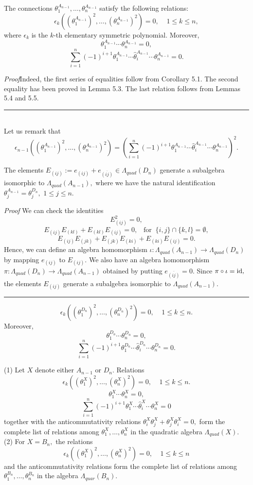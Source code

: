 \begin{thm}
The connections $\theta_1^{A_{n-1}},\ldots,
\theta_n^{A_{n-1}}$ satisfy 
the following relations: 
\[ \epsilon_k((\theta_1^{A_{n-1}})^2,\ldots,(\theta_n^{A_{n-1}})^2)=0, 
\; \; \; \; 1\leq k \leq n, \] 
where $\epsilon_k$ is the $k$-th elementary symmetric polynomial. 
Moreover, 
\[ \theta_1^{A_{n-1}}\cdots \theta_n^{A_{n-1}}=0, \]
\[ \sum_{i=1}^n (-1)^{i+1}\theta_1^{A_{n-1}}\cdots 
\hat{\theta}_i^{A_{n-1}}\cdots \theta_n^{A_{n-1}} =0. \]
\end{thm}
{\it Proof}\quad Indeed, the first series of equalities 
follow from Corollary 5.1. The second equality has been proved in 
Lemma 5.3. 
The last relation follows from 
Lemmas 5.4 and 5.5. 
\quad \rule{3mm}{3mm} 
\medskip \\ 
Let us remark that 
\[ \epsilon_{n-1}((\theta_1^{A_{n-1}})^2,\ldots,(\theta_n^{A_{n-1}})^2)
= \left( \sum_{i=1}^n (-1)^{i+1}\theta_1^{A_{n-1}}\cdots 
\hat{\theta}_i^{A_{n-1}}\cdots \theta_n^{A_{n-1}} \right) ^2. \] 
\begin{prop}
The elements $E_{(ij)}:=e_{(ij)}+e_{\overline{(ij)}}\in 
\Lambda_{quad}(D_n)$ generate a subalgebra isomorphic to 
$\Lambda_{quad}(A_{n-1}),$ where we have the natural 
identification $\theta_j^{A_{n-1}}
=\theta_j^{D_n},$ $1\leq j \leq n.$ 
\end{prop}
{\it Proof} \quad We can check the identities 
\[ E_{(ij)}^2=0, \] 
\[ E_{(ij)}E_{(kl)}+E_{(kl)}E_{(ij)}=0, \; \; \; 
\textrm{for} \; \; \{ i,j \} \cap \{ k,l \} = \emptyset , \] 
\[ E_{(ij)}E_{(jk)}+E_{(jk)}E_{(ki)} + E_{(ki)}E_{(ij)}=0. \] 
Hence, we can define an algebra homomorphism 
$\iota : \Lambda_{quad}(A_{n-1}) \rightarrow \Lambda_{quad}(D_n)$ 
by mapping $e_{(ij)}$ to $E_{(ij)}.$ We also have an algebra 
homomorphism $\pi : \Lambda_{quad}(D_n) \rightarrow 
\Lambda_{quad}(A_{n-1})$ 
obtained by putting $e_{\overline{(ij)}}=0.$ Since 
$\pi \circ \iota = {\rm id},$ 
the elements $E_{(ij)}$ generate a subalgebra isomorphic to 
$\Lambda_{quad}(A_{n-1}).$ \quad \rule{3mm}{3mm}
\begin{cor}
\[ \epsilon_k((\theta_1^{D_n})^2,\ldots,(\theta_n^{D_n})^2)=0, 
\; \; \; \; 1\leq k \leq n. \] 
Moreover, 
\[ \theta_1^{D_n}\cdots \theta_n^{D_n}=0, \]
\[ \sum_{i=1}^n (-1)^{i+1}\theta_1^{D_n}\cdots 
\hat{\theta}_i^{D_n}\cdots \theta_n^{D_n} =0. \]
\end{cor}
\begin{conj}{\rm (1) Let $X$ denote either $A_{n-1}$ or 
$D_n.$ Relations 
\[ \epsilon_k((\theta_1^X)^2,\ldots,(\theta_n^X)^2)=0, 
\; \; \; \; 1\leq k \leq n. \] 
\[ \theta_1^X\cdots \theta_n^X=0, \]
\[ \sum_{i=1}^n (-1)^{i+1}\theta_1^X\cdots 
\hat{\theta}_i^X\cdots \theta_n^X =0 \]
together 
with the anticommutativity relations $\theta_i^X\theta_j^X+
\theta_j^X\theta_i^X=0,$ form the complete list of relations 
among $\theta_1^X,\ldots ,\theta_n^X$ in the quadratic 
algebra $\Lambda_{quad}(X).$ \medskip \\ 
(2) For $X=B_n,$ the relations 
\[ \epsilon_k((\theta_1^X)^2,\ldots,(\theta_n^X)^2)=0, 
\; \; \; \; 1\leq k \leq n \] 
and the anticommutativity relations form the complete list of relations 
among $\theta_1^{B_n},\ldots ,\theta_n^{B_n}$ in the algebra 
$\Lambda_{quar}(B_n).$}
\end{conj}
